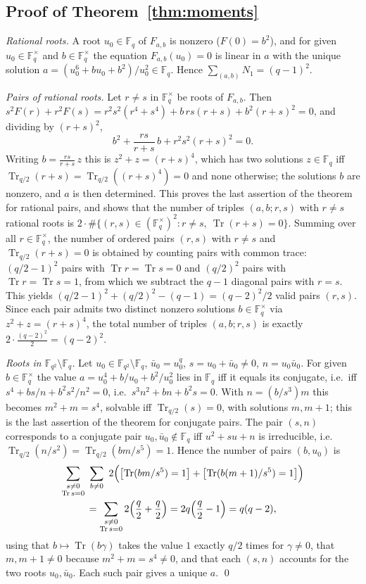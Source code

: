 \documentclass[12pt,a4paper]{amsart}
\theoremstyle{definition}
\newcommand{\F}{\mathbb{F}}
\newcommand{\Tr}{\operatorname{Tr}}
\begin{document}
\subsection{Proof of Theorem~\ref{thm:moments}}
\emph{Rational roots.} A root $u_0\in\F_q$ of $F_{a,b}$ is nonzero ($F(0)=b^2$), and for given $u_0\in\F_q^\times$ and $b\in\F_q^\times$ the equation $F_{a,b}(u_0)=0$ is linear in $a$ with the unique solution $a=(u_0^6+bu_0+b^2)/u_0^2\in\F_q$. Hence $\sum_{(a,b)}N_1=(q-1)^2$.

\emph{Pairs of rational roots.} Let $r\ne s$ in $\F_q^\times$ be roots of $F_{a,b}$. Then $s^2F(r)+r^2F(s)=r^2s^2(r^4+s^4)+b\,rs(r+s)+b^2(r+s)^2=0$, and dividing by $(r+s)^2$,
\[
b^2+\frac{rs}{r+s}\,b+r^2s^2(r+s)^2=0 .
\]
Writing $b=\frac{rs}{r+s}\,z$ this is $z^2+z=(r+s)^4$, which has two solutions $z\in\F_q$ iff $\Tr_{q/2}(r+s)=\Tr_{q/2}((r+s)^4)=0$ and none otherwise; the solutions $b$ are nonzero, and $a$ is then determined. This proves the last assertion of the theorem for rational pairs, and shows that the number of triples $(a,b;r,s)$ with $r\ne s$ rational roots is $2\cdot\#\{(r,s)\in(\F_q^\times)^2:r\ne s,\ \Tr(r+s)=0\}$. Summing over all $r\in\F_q^\times$, the number of ordered pairs $(r,s)$ with $r\ne s$ and $\Tr_{q/2}(r+s)=0$ is obtained by counting pairs with common trace: $(q/2-1)^2$ pairs with $\Tr r=\Tr s=0$ and $(q/2)^2$ pairs with $\Tr r=\Tr s=1$, from which we subtract the $q-1$ diagonal pairs with $r=s$. This yields $(q/2-1)^2+(q/2)^2-(q-1)=(q-2)^2/2$ valid pairs $(r,s)$. Since each pair admits two distinct nonzero solutions $b\in\F_q^\times$ via $z^2+z=(r+s)^4$, the total number of triples $(a,b;r,s)$ is exactly $2\cdot\frac{(q-2)^2}2=(q-2)^2$.

\emph{Roots in $\F_{q^2}\setminus\F_q$.} Let $u_0\in\F_{q^2}\setminus\F_q$, $\bar u_0=u_0^q$, $s=u_0+\bar u_0\ne0$, $n=u_0\bar u_0$. For given $b\in\F_q^\times$ the value $a=u_0^4+b/u_0+b^2/u_0^2$ lies in $\F_q$ iff it equals its conjugate, i.e.\ iff $s^4+bs/n+b^2s^2/n^2=0$, i.e.\ $s^3n^2+bn+b^2s=0$. With $n=(b/s^3)m$ this becomes $m^2+m=s^4$, solvable iff $\Tr_{q/2}(s)=0$, with solutions $m,m+1$; this is the last assertion of the theorem for conjugate pairs. The pair $(s,n)$ corresponds to a conjugate pair $u_0,\bar u_0\notin\F_q$ iff $u^2+su+n$ is irreducible, i.e.\ $\Tr_{q/2}(n/s^2)=\Tr_{q/2}(bm/s^5)=1$. Hence the number of pairs $(b,u_0)$ is
\begin{multline*}
\sum_{\substack{s\ne0\\ \Tr s=0}}\ \sum_{b\ne0}\ 2\Bigl(\bigl[\Tr(bm/s^5)=1\bigr]+\bigl[\Tr(b(m+1)/s^5)=1\bigr]\Bigr)\\
=\sum_{\substack{s\ne0\\ \Tr s=0}}2\Bigl(\frac q2+\frac q2\Bigr)=2q\Bigl(\frac q2-1\Bigr)=q(q-2),
\end{multline*}
using that $b\mapsto\Tr(b\gamma)$ takes the value $1$ exactly $q/2$ times for $\gamma\ne0$, that $m,m+1\ne0$ because $m^2+m=s^4\ne0$, and that each $(s,n)$ accounts for the two roots $u_0,\bar u_0$. Each such pair gives a unique $a$. \qed
\end{document}

